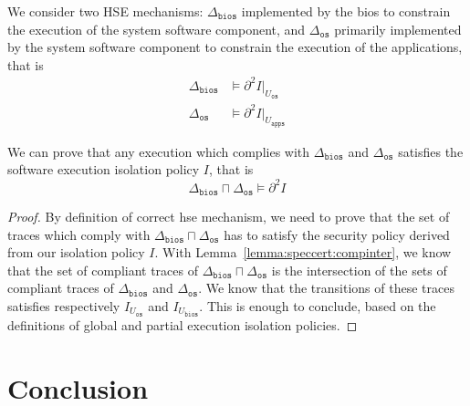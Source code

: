 \begin{example}
  We consider two HSE mechanisms: $\Delta_\mathtt{bios}$ implemented by the
  \ac{bios} to constrain the execution of the system software component, and
  $\Delta_\mathtt{os}$ primarily implemented by the system software component to
  constrain the execution of the applications, that is
  \[
    \begin{array}{cl}
      \Delta_{\mathtt{bios}}
      & \models \partial^2 I|_{U_{\mathtt{os}}} \\
      \Delta_{\mathtt{os}} & \models
                             \partial^2 I|_{U_{\mathtt{apps}}}
    \end{array}
  \]

  We can prove that any execution which complies with $\Delta_\mathtt{bios}$ and
  $\Delta_\mathtt{os}$ satisfies the software execution isolation policy $I$,
  that is
  \[
    \Delta_{\mathtt{bios}} \sqcap \Delta_{\mathtt{os}} \models \partial^2 I
  \]

  \begin{proof}
    By definition of correct \ac{hse} mechanism, we need to prove that the set
    of traces which comply with
    $\Delta_{\mathtt{bios}} \sqcap \Delta_{\mathtt{os}}$ has to satisfy the
    security policy derived from our isolation policy $I$.
    With Lemma~\ref{lemma:speccert:compinter}, we know that the set of compliant
    traces of $\Delta_{\mathtt{bios}} \sqcap \Delta_{\mathtt{os}}$ is the
    intersection of the sets of compliant traces of $\Delta_{\mathtt{bios}}$ and
    $\Delta_{\mathtt{os}}$.
    We know that the transitions of these traces satisfies respectively
    $I_{U_{\mathtt{os}}}$ and $I_{U_{\mathtt{bios}}}$.
    This is enough to conclude, based on the definitions of global and partial
    execution isolation policies.
  \end{proof}
\end{example}

\section{Conclusion}

